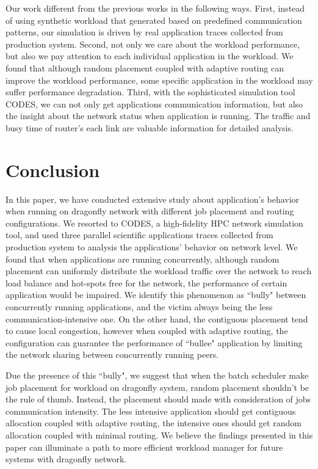 \documentclass[conference,compsoc]{IEEEtran}
\begin{document}
Our work different from the previous works in the following ways. First, instead of using synthetic workload that generated based on predefined communication patterns, our simulation is driven by real application traces collected from production system. Second, not only we care about the workload performance, but also we pay attention to each individual application in the workload. We found that although random placement coupled with adaptive routing can improve the workload performance, some specific application in the workload may suffer performance degradation. Third, with the sophisticated simulation tool CODES, we can not only get applications communication information, but also the insight about the network status when application is running. The traffic and busy time of router's each link are valuable information for detailed analysis.

\section{Conclusion}
\label{sec:conclusion}

In this paper, we have conducted extensive study about application's behavior when running on dragonfly network with different job placement and routing configurations. We resorted to CODES, a high-fidelity HPC network simulation tool, and used three parallel scientific applications traces collected from production system to analysis the applications' behavior on network level. We found that when applications are running concurrently, although random placement can uniformly distribute the workload traffic over the network to reach load balance and hot-spots free for the network, the performance of certain application would be impaired. We identify this phenomenon as ``bully" between concurrently running applications, and the victim always being the less communication-intensive one. On the other hand, the contiguous placement tend to cause local congestion, however when coupled with adaptive routing, the configuration can guarantee the performance of ``bullee" application by limiting the network sharing between concurrently running peers. 

Due the presence of this ``bully", we suggest that when the batch scheduler make job placement for workload on dragonfly system, random placement shouldn't be the rule of thumb. Instead, the placement should made with consideration of jobs communication intensity. The less intensive application should get contiguous allocation coupled with adaptive routing, the intensive ones should get random allocation coupled with minimal routing. We believe the findings presented in this paper can illuminate a path to more efficient workload manager for future systems with dragonfly network.
\end{document}
